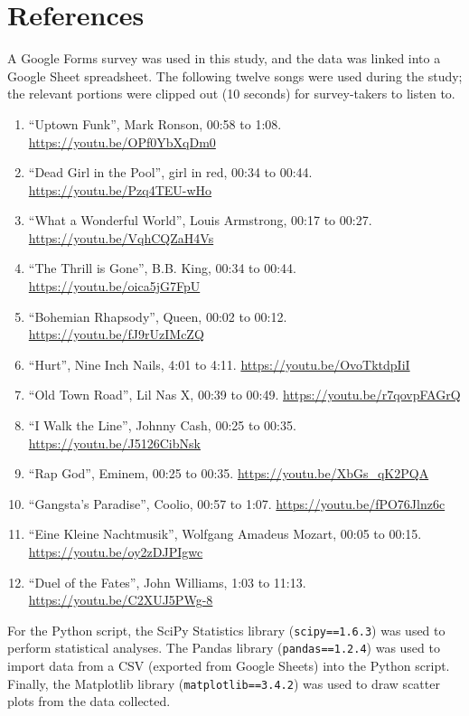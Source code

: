 \documentclass[12pt]{report}
\begin{document}
\chapter*{References}
A Google Forms survey was used in this study, and the data was linked into a Google Sheet spreadsheet. The following twelve songs were used during the study; the relevant portions were clipped out (10 seconds) for survey-takers to listen to.

\begin{enumerate}
  \item ``Uptown Funk'', Mark Ronson, 00:58 to 1:08. \url{https://youtu.be/OPf0YbXqDm0}
  \item ``Dead Girl in the Pool'', girl in red, 00:34 to 00:44. \url{https://youtu.be/Pzq4TEU-wHo}
  \item ``What a Wonderful World'', Louis Armstrong, 00:17 to 00:27. \url{https://youtu.be/VqhCQZaH4Vs}
  \item ``The Thrill is Gone'', B.B. King, 00:34 to 00:44. \url{https://youtu.be/oica5jG7FpU}
  \item ``Bohemian Rhapsody'', Queen, 00:02 to 00:12. \url{https://youtu.be/fJ9rUzIMcZQ}
  \item ``Hurt'', Nine Inch Nails, 4:01 to 4:11. \url{https://youtu.be/OvoTktdpIiI}
  \item ``Old Town Road'', Lil Nas X, 00:39 to 00:49. \url{https://youtu.be/r7qovpFAGrQ}
  \item ``I Walk the Line'', Johnny Cash, 00:25 to 00:35. \url{https://youtu.be/J5126CibNsk}
  \item ``Rap God'', Eminem, 00:25 to 00:35. \url{https://youtu.be/XbGs_qK2PQA}
  \item ``Gangsta's Paradise'', Coolio, 00:57 to 1:07. \url{https://youtu.be/fPO76Jlnz6c}
  \item ``Eine Kleine Nachtmusik'', Wolfgang Amadeus Mozart, 00:05 to 00:15. \url{https://youtu.be/oy2zDJPIgwc}
  \item ``Duel of the Fates'', John Williams, 1:03 to 11:13. \url{https://youtu.be/C2XUJ5PWg-8}
\end{enumerate}

For the Python script, the SciPy Statistics library (\texttt{scipy==1.6.3}) was used to perform statistical analyses. The Pandas library (\texttt{pandas==1.2.4}) was used to import data from a CSV (exported from Google Sheets) into the Python script. Finally, the Matplotlib library (\texttt{matplotlib==3.4.2}) was used to draw scatter plots from the data collected.
\end{document}
